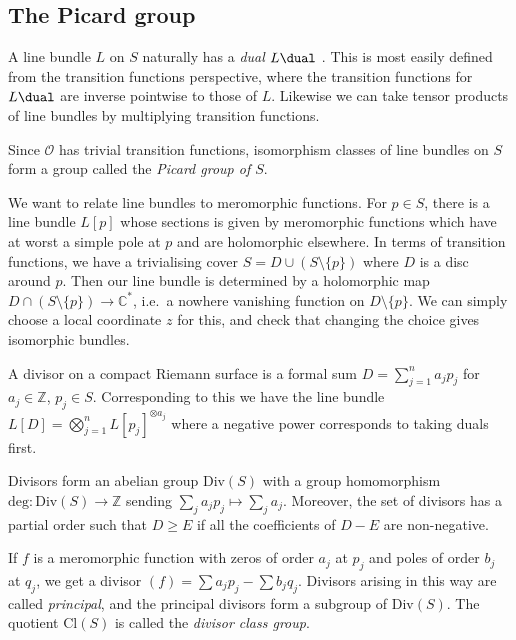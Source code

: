 \subsection{The Picard group} A line bundle \(L\) on \(S\) naturally has a
\textit{dual} \(L\dual\) . This is most easily defined from the transition
functions perspective, where the transition functions for \(L\dual\) are inverse
pointwise to those of \(L\). Likewise we can take tensor products of line
bundles by multiplying transition functions. 

Since \(\mathscr{O}\) has trivial
transition functions, isomorphism classes of line bundles on \(S\) form a group
called the \textit{Picard group of \(S\)}.

We want to relate line bundles to meromorphic functions. For \(p\in S\), there
is a line bundle \(L[p]\) whose sections is given by meromorphic functions which
have at worst a simple pole at \(p\) and are holomorphic elsewhere. In terms of
transition functions, we have a trivialising cover \(S=D\cup (S\setminus
\{p\})\) where \(D\) is a disc around \(p\). Then our line bundle is determined
by a holomorphic map \(D\cap (S\setminus \{p\})\to \mathbb{C}^\ast\), i.e.\ a
nowhere vanishing function on \(D\setminus \{p\}\). We can simply choose a local
coordinate \(z\) for this, and check that changing the choice gives isomorphic
bundles.

\begin{definition}
    A divisor on a compact Riemann surface is a formal sum \(D=\sum_{j=1}^n
    a_jp_j\) for \(a_j\in \mathbb{Z}\), \(p_j\in S\). Corresponding to this we
    have the line bundle \(L[D]=\bigotimes_{j=1}^n L[p_j]^{\otimes a_j}\) where
    a negative power corresponds to taking duals first.
\end{definition}

Divisors form an abelian group \(\text{Div}(S)\) with a group homomorphism
\(\text{deg}:\text{Div}(S)\to \mathbb{Z}\) sending \(\sum_j a_j p_j\mapsto
\sum_j a_j\). Moreover, the set of divisors has a partial order such that
\(D\geq E\) if all the coefficients of \(D-E\) are non-negative.

If \(f\) is a meromorphic function with zeros of order \(a_j\) at \(p_j\) and
poles of order \(b_j\) at \(q_j\), we get a divisor \((f)=\sum a_jp_j - \sum
b_j q_j\). Divisors arising in this way are called \textit{principal}, and the
principal divisors form a subgroup of \(\text{Div}(S)\). The quotient
\(\text{Cl}(S)\) is called the \textit{divisor class group}.

